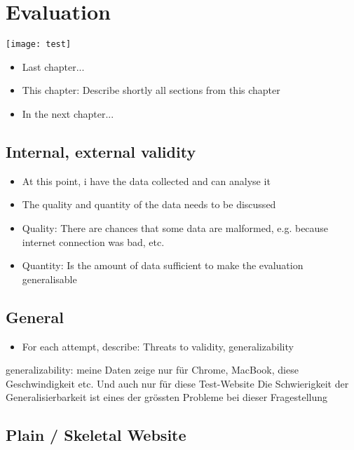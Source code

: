 \chapter{Evaluation}


\texttt{[image: test]}


\begin{itemize}
	\item Last chapter...
	\item This chapter: Describe shortly all sections from this chapter
	\item In the next chapter...
\end{itemize}




\section{Internal, external validity}


\begin{itemize}
\item At this point, i have the data collected and can analyse it
\item The quality and quantity of the data needs to be discussed
\item Quality: There are chances that some data are malformed, e.g. because internet connection was bad, etc.
\item Quantity: Is the amount of data sufficient to make the evaluation generalisable
\end{itemize}



\section{General}

\begin{itemize}
    \item For each attempt, describe: Threats to validity, generalizability
\end{itemize}

generalizability: meine Daten zeige nur für Chrome, MacBook, diese Geschwindigkeit etc.
Und auch nur für diese Test-Website
Die Schwierigkeit der Generalisierbarkeit ist eines der grössten Probleme bei dieser Fragestellung

\section{Plain / Skeletal Website}

